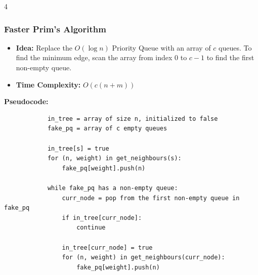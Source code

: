 \documentclass[fontsize=6pt, landscape, a4paper]{scrartcl}
\begin{document}
\begin{multicols*}{4}
        \subsubsection*{Faster Prim's Algorithm}
        \begin{itemize}
            \item \textbf{Idea:} Replace the $O(\log n)$ Priority Queue with an array of $c$ queues. To find the minimum edge, scan the array from index $0$ to $c-1$ to find the first non-empty queue.
            \item \textbf{Time Complexity:} $O(c(n + m))$
        \end{itemize}

        \textbf{Pseudocode:}
        \begin{verbatim}
            in_tree = array of size n, initialized to false
            fake_pq = array of c empty queues

            in_tree[s] = true
            for (n, weight) in get_neighbours(s): 
                fake_pq[weight].push(n)

            while fake_pq has a non-empty queue:
                curr_node = pop from the first non-empty queue in fake_pq
                if in_tree[curr_node]: 
                    continue
                    
                in_tree[curr_node] = true
                for (n, weight) in get_neighbours(curr_node): 
                    fake_pq[weight].push(n)
        \end{verbatim}


\end{multicols*}
\end{document}
